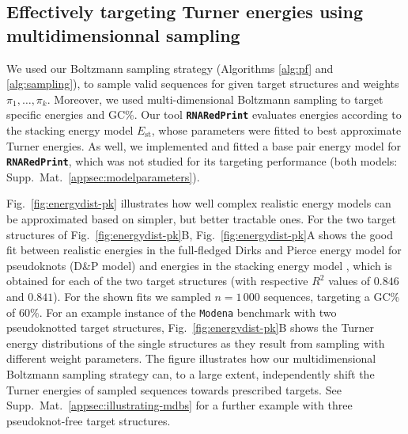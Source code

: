 \documentclass[]{bmcart}
\newcommand{\Nuc}[1]{{\sf #1}}
\newcommand{\Cb}{\Nuc{C}}
\newcommand{\Gb}{\Nuc{G}}
\newcommand{\GCb}{\Gb\Cb}
\newcommand{\ourprog}{{\tt \bfseries{}\color{black!85}RNA\textcolor{red!70!black}{Red}Print}}
\newcommand{\EnergyStacking}{E_{\text{st}}}
\newcommand{\revised}[1]{{\color{red} #1}}
\begin{document}
\subsection*{Effectively targeting Turner energies using multidimensionnal sampling}
\revised{


We used our Boltzmann sampling strategy (Algorithms
\ref{alg:pf} and \ref{alg:sampling}), to sample valid sequences for
given target structures and weights $\pi_1,\dots,\pi_k$.  Moreover, we
used multi-dimensional Boltzmann sampling to target specific energies and
\GCb\%.  Our tool \ourprog{} evaluates energies according to the
stacking energy model $\EnergyStacking$, whose parameters were fitted
to best approximate Turner energies. As well, we implemented and
fitted a base pair energy model for \ourprog{}, which was not studied
for its targeting performance (both models:
Supp.\ Mat.~\ref{appsec:modelparameters}).
%
%


Fig.~\ref{fig:energydist-pk} illustrates how well complex realistic energy models can be approximated based on simpler, but better tractable ones. For
the two target structures of Fig.~\ref{fig:energydist-pk}B,
Fig.~\ref{fig:energydist-pk}A shows the good fit between realistic
energies in the full-fledged Dirks and Pierce energy model for
pseudoknots (D\&P model) and energies in the stacking energy
model\revised{, which is obtained for each of the two target structures (with respective $R^2$ values of $0.846$ and $0.841$)}. For the shown fits we sampled $n=1\,000$ sequences, targeting a
\GCb\% of $60\%$.
%
For an example instance of the \texttt{Modena} benchmark with two
pseudoknotted target structures, Fig.~\ref{fig:energydist-pk}B shows
the Turner energy distributions of the single structures as they
result from sampling with different weight parameters. The figure
illustrates how our multidimensional Boltzmann sampling strategy can,
to a large extent, independently shift the Turner energies of sampled
sequences towards prescribed targets. See Supp.\ Mat.~\ref{appsec:illustrating-mdbs} for a further example with three
pseudoknot-free target structures.}
\end{document}
